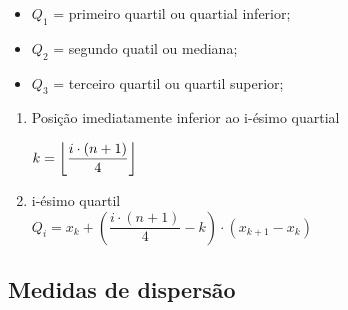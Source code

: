\begin{itemize}
	\item $Q_1$ = primeiro quartil ou quartial inferior;
	\item $Q_2$ = segundo quatil ou mediana;
	\item $Q_3$ = terceiro quartil ou quartil superior;
\end{itemize}

\begin{enumerate}[i]
	\item Posição imediatamente inferior ao i-ésimo quartial
	
		\begin{center}
			$k=\floor*{\dfrac{i\cdot(n+1)}{4}}$
		\end{center}
	
	\item i-ésimo quartil\\
		$Q_i=x_k+ \left(\dfrac{i\cdot(n+1)}{4}-k\right)\cdot(x_{k+1}-x_k)$
\end{enumerate}

\subsection{Medidas de dispersão}

